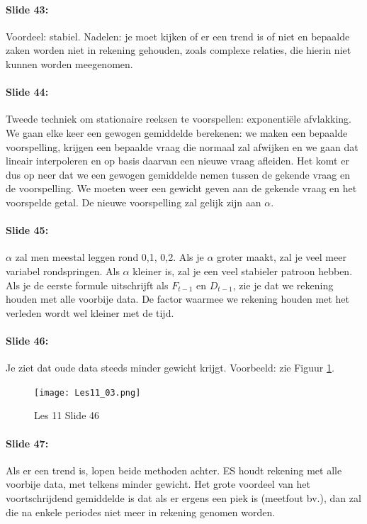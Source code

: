 \documentclass[10pt,a4paper]{report}
\begin{document}
\paragraph{Slide 43:} Voordeel: stabiel. Nadelen: je moet kijken of er een trend is of niet en bepaalde zaken worden niet in rekening gehouden, zoals complexe relaties, die hierin niet kunnen worden meegenomen.

\paragraph{Slide 44:} Tweede techniek om stationaire reeksen te voorspellen: exponenti\"ele afvlakking. We gaan elke keer een gewogen gemiddelde berekenen: we maken een bepaalde voorspelling, krijgen een bepaalde vraag die normaal zal afwijken en we gaan dat lineair interpoleren en op basis daarvan een nieuwe vraag afleiden. Het komt er dus op neer dat we een gewogen gemiddelde nemen tussen de gekende vraag en de voorspelling. We moeten weer een gewicht geven aan de gekende vraag en het voorspelde getal. De nieuwe voorspelling zal gelijk zijn aan $\alpha$. 

\paragraph{Slide 45:} $\alpha$ zal men meestal leggen rond 0,1, 0,2. Als je $\alpha$ groter maakt, zal je veel meer variabel rondspringen. Als $\alpha$ kleiner is, zal je een veel stabieler patroon hebben. Als je de eerste formule uitschrijft als $F_{t-1}$ en $D_{t-1}$, zie je dat we rekening houden met alle voorbije data. De factor waarmee we rekening houden met het verleden wordt wel kleiner met de tijd. 

\paragraph{Slide 46:} Je ziet dat oude data steeds minder gewicht krijgt.
Voorbeeld: zie Figuur \ref{les11_03}.

\begin{figure}[h!]
\centering
\texttt{[image: Les11\_03.png]}
\caption{Les 11 Slide 46} 
\label{les11_03}
\end{figure}

\paragraph{Slide 47:} Als er een trend is, lopen beide methoden achter. ES houdt rekening met alle voorbije data, met telkens minder gewicht. Het grote voordeel van het voortschrijdend gemiddelde is dat als er ergens een piek is (meetfout bv.), dan zal die na enkele periodes niet meer in rekening genomen worden. 
\end{document}
